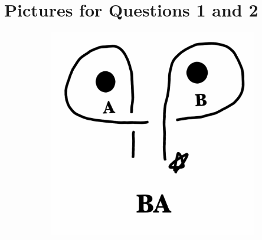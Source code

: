\documentclass[12pt,letterpaper]{article}
\theoremstyle{definition}
\begin{document}
\setlength{\parskip}{1ex plus 0.5ex minus 0.2ex}
\setlength{\parindent}{0pt}

\pagestyle{fancy}
\cfoot{}


\section*{Pictures for Questions 1 and 2}

\begin{figure}[h!]
    \begin{subfigure}[b]{0.4\textwidth}
        \includegraphics[width=\textwidth]{meeting02pics/BA-label.png}
    \end{subfigure}
    \qquad
    \begin{subfigure}[b]{0.4\textwidth}

\end{subfigure}
\end{figure}
\end{document}
